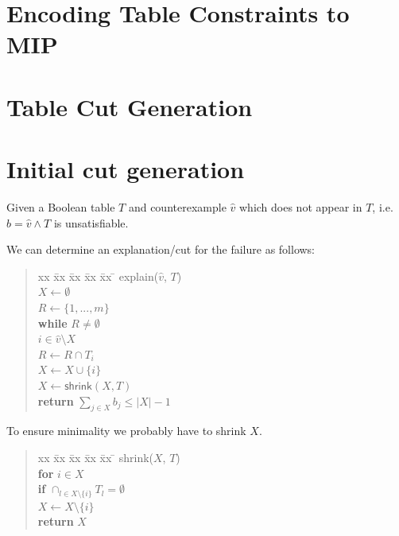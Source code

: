 \documentclass{article}
\begin{document}
\section{Encoding Table Constraints to MIP}





\section{Table Cut Generation}



\section{Initial cut generation}

Given a Boolean table $T$ and 
counterexample $\hat{v}$ 
which does not appear in $T$,
i.e. $\hat{b} = \hat{v} \wedge T$ 
is unsatisfiable. 

We can determine an explanation/cut for the failure as follows:
\begin{quote} 
\begin{tabbing}
    xx \= xx \= xx \= xx \= xx \= \kill
    \textsf{explain}($\hat{v}$, $T$) \\
    \> $X \gets \emptyset$ \\
    \> $R \gets \{1, ..., m\}$ \\
    \> \textbf{while} $R \neq \emptyset$ \\
    \> \>  $i \in \hat{v} \setminus X$ \\
    \> \> $R \gets R \cap T_i$ \\
    \> \> $X \gets X \cup \{i\}$ \\
    \> $X \gets \textsf{shrink}(X,T)$ \\
    \> \textbf{return} $\sum_{j \in X} b_j \leq |X|-1$
\end{tabbing}
\end{quote}

To ensure minimality we probably have to shrink $X$. 
\begin{quote} 
\begin{tabbing}
    xx \= xx \= xx \= xx \= xx \= \kill
    \textsf{shrink}($X$, $T$) \\
    \> \textbf{for} $i \in X$ \\
    \> \> \textbf{if} $\cap_{l \in X \setminus \{i\}} T_l = \emptyset$ \\
    \> \> \> $X \gets X \setminus \{i\}$ \\
    \> \textbf{return} $X$
\end{tabbing}
\end{quote}
\end{document}
